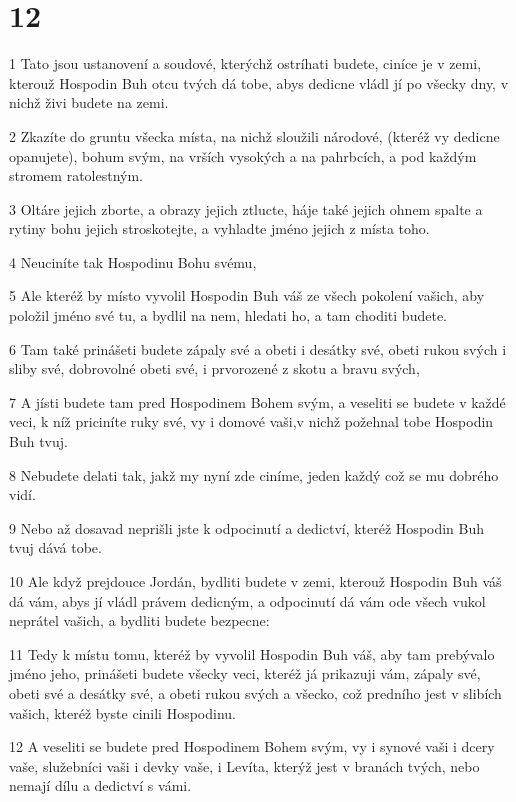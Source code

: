 \chapter{12}

\par 1 Tato jsou ustanovení a soudové, kterýchž ostríhati budete, ciníce je v zemi, kterouž Hospodin Buh otcu tvých dá tobe, abys dedicne vládl jí po všecky dny, v nichž živi budete na zemi.
\par 2 Zkazíte do gruntu všecka místa, na nichž sloužili národové, (kteréž vy dedicne opanujete), bohum svým, na vrších vysokých a na pahrbcích, a pod každým stromem ratolestným.
\par 3 Oltáre jejich zborte, a obrazy jejich ztlucte, háje také jejich ohnem spalte a rytiny bohu jejich stroskotejte, a vyhladte jméno jejich z místa toho.
\par 4 Neuciníte tak Hospodinu Bohu svému,
\par 5 Ale kteréž by místo vyvolil Hospodin Buh váš ze všech pokolení vašich, aby položil jméno své tu, a bydlil na nem, hledati ho, a tam choditi budete.
\par 6 Tam také prinášeti budete zápaly své a obeti i desátky své, obeti rukou svých i sliby své, dobrovolné obeti své, i prvorozené z skotu a bravu svých,
\par 7 A jísti budete tam pred Hospodinem Bohem svým, a veseliti se budete v každé veci, k níž priciníte ruky své, vy i domové vaši,v nichž požehnal tobe Hospodin Buh tvuj.
\par 8 Nebudete delati tak, jakž my nyní zde ciníme, jeden každý což se mu dobrého vidí.
\par 9 Nebo až dosavad neprišli jste k odpocinutí a dedictví, kteréž Hospodin Buh tvuj dává tobe.
\par 10 Ale když prejdouce Jordán, bydliti budete v zemi, kterouž Hospodin Buh váš dá vám, abys jí vládl právem dedicným, a odpocinutí dá vám ode všech vukol neprátel vašich, a bydliti budete bezpecne:
\par 11 Tedy k místu tomu, kteréž by vyvolil Hospodin Buh váš, aby tam prebývalo jméno jeho, prinášeti budete všecky veci, kteréž já prikazuji vám, zápaly své, obeti své a desátky své, a obeti rukou svých a všecko, což predního jest v slibích vašich, kteréž byste cinili Hospodinu.
\par 12 A veseliti se budete pred Hospodinem Bohem svým, vy i synové vaši i dcery vaše, služebníci vaši i devky vaše, i Levíta, kterýž jest v branách tvých, nebo nemají dílu a dedictví s vámi.
